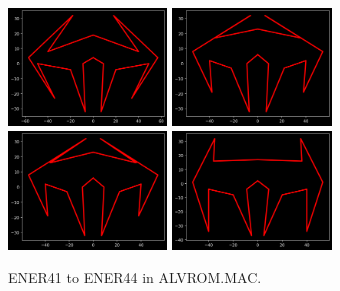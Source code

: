 \begin{figure}[H]
  \centering
        \includegraphics[width=4.22cm]{src/tempest_unused/ENER41.png}%
        \hspace{0.2cm}
        \includegraphics[width=4.22cm]{src/tempest_unused/ENER42.png}%
        \hspace{0.2cm}
        \includegraphics[width=4.22cm]{src/tempest_unused/ENER43.png}%
        \hspace{0.2cm}
        \includegraphics[width=4.22cm]{src/tempest_unused/ENER44.png}%
  \caption*{ENER41 to ENER44 in ALVROM.MAC.}
\end{figure}
